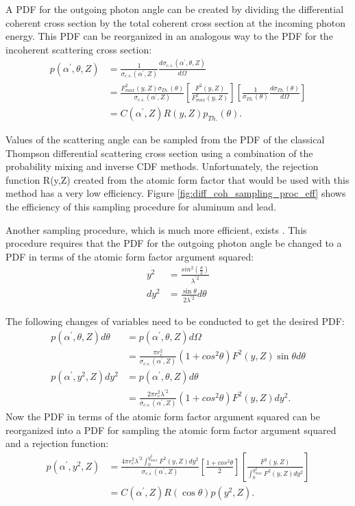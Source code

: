 A PDF for the outgoing photon angle can be created by dividing the differential
coherent cross section by the total coherent cross section at the incoming
photon energy. This PDF can be reorganized in an analogous way to the PDF for 
the incoherent scattering cross section:
\begin{align}
  p(\alpha^{'},\theta,Z) & = \frac{1}{\sigma_{c.s.}(\alpha^{'},Z)}
  \frac{d\sigma_{c.s.}(\alpha^{'},\theta,Z)}{d\Omega} \nonumber \\
  & = \frac{F^2_{max}(y,Z) \sigma_{Th.}(\theta)}{\sigma_{c.s.}(\alpha^{'},Z)}
  \left[\frac{F^2(y,Z)}{F^2_{max}(y,Z)}\right]
  \left[\frac{1}{\sigma_{Th.}(\theta)} \frac{d\sigma_{Th.}(\theta)}{d\Omega}
  \right] \nonumber \\
  & = C(\alpha^{'},Z)R(y,Z)p_{Th.}(\theta). \nonumber
\end{align}

Values of the scattering angle can be sampled from the PDF of the classical 
Thompson differential scattering cross section using a combination of the 
probability mixing and inverse CDF methods. Unfortunately, the rejection
function R(y,Z) created from the atomic form factor that would be used with this
method has a very low efficiency. Figure \ref{fig:diff_coh_sampling_proc_eff} 
shows the efficiency of this sampling procedure for aluminum and lead. 

Another sampling procedure, which is much more efficient, exists
\citep{persliden_monte_1983}. This procedure requires that the PDF for the 
outgoing photon angle be changed to a PDF in terms of the atomic form factor 
argument squared:
\begin{align}
  y^2 & = \frac{sin^2\left(\frac{\theta}{2} \right)}{\lambda^{'2}} \\
  dy^2 & = \frac{\sin{\theta}}{2\lambda^{'2}} d\theta \nonumber
\end{align}

The following changes of variables need to be conducted to get the desired
PDF:
\begin{align}
  p(\alpha^{'},\theta,Z)d\theta & = p(\alpha^{'},\theta,Z)d\Omega \nonumber \\
  & = \frac{\pi r_e^2}{\sigma_{c.s.}(\alpha^{'},Z)}(1 + cos^2\theta) F^2(y,Z) 
  \sin{\theta} d\theta \nonumber \\
  p(\alpha^{'},y^2,Z)dy^2 & = p(\alpha^{'},\theta,Z)d\theta \nonumber \\
  & = \frac{2\pi r_e^2 \lambda^{'2}}{\sigma_{c.s.}(\alpha^{'},Z)}
  (1 + cos^2\theta)F^2(y,Z) dy^2.
\end{align}
Now the PDF in terms of the atomic form factor argument squared can be 
reorganized into a PDF for sampling the atomic form factor argument squared
and a rejection function:
\begin{align}
  p(\alpha^{'},y^2,Z) & = 
  \frac{4\pi r_e^2 \lambda^{'2} \int_0^{y_{max}^2}F^2(y,Z)dy^2}
  {\sigma_{c.s.}(\alpha^{'},Z)} \left[\frac{1+cos^2\theta}{2} \right]
  \left[\frac{F^2(y,Z)}{\int_0^{y_{max}^2}F^2(y,Z)dy^2} \right] \nonumber \\
  & = C(\alpha^{'},Z)R(\cos{\theta})p(y^2,Z).
\end{align}

